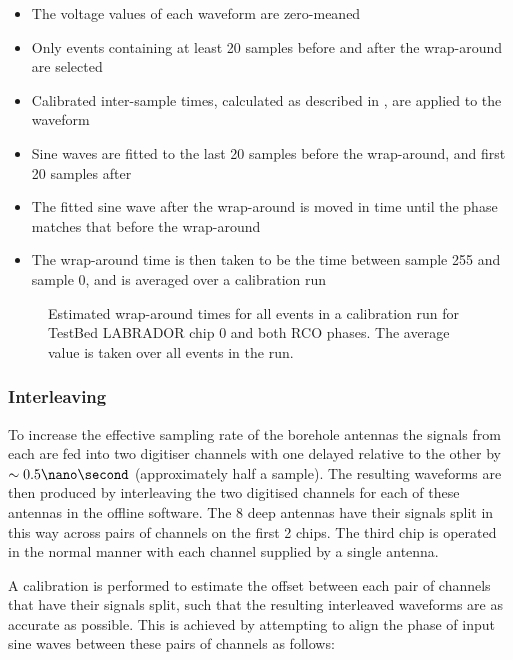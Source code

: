 \begin{itemize}
\item The voltage values of each waveform are zero-meaned
\item Only events containing at least 20 samples before and after the wrap-around are selected
\item Calibrated inter-sample times, calculated as described in , are applied to the waveform 
\item Sine waves are fitted to the last 20 samples before the wrap-around, and first 20 samples after
\item The fitted sine wave after the wrap-around is moved in time until the phase matches that before the wrap-around
\item The wrap-around time is then taken to be the time between sample 255 and sample 0, and is averaged over a calibration run
\end{itemize}


\begin{figure}[htpb]
  \hfill
  \caption{Estimated wrap-around times for all events in a calibration run for TestBed LABRADOR chip 0 and both RCO phases. The average value is taken over all events in the run.}
  \label{fig:calibration:LABRADOR-Digitiser-Chip:Wrap-around}
\end{figure}


\subsubsection{Interleaving}
\label{sec:calibration:LABRADOR-Digitiser-Chip:Interleaving}

To increase the effective sampling rate of the borehole antennas the signals from each are fed into two digitiser channels with one delayed relative to the other by $\sim 0.5 \nano \second$ (approximately half a sample). The resulting waveforms are then produced by interleaving the two digitised channels for each of these antennas in the offline software. The 8 deep antennas have their signals split in this way across pairs of channels on the first 2 chips. The third chip is operated in the normal manner with each channel supplied by a single antenna.

A calibration is performed to estimate the offset between each pair of channels that have their signals split, such that the resulting interleaved waveforms are as accurate as possible. This is achieved by attempting to align the phase of input sine waves between these pairs of channels as follows:

